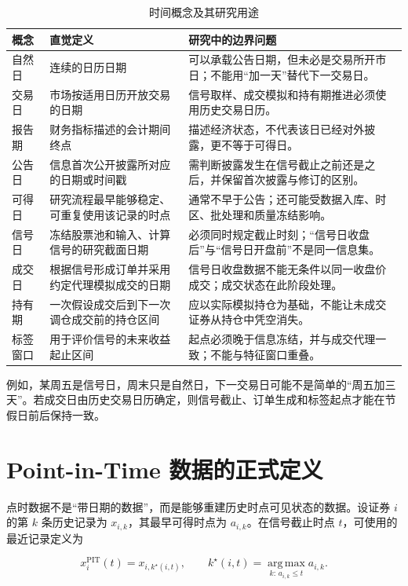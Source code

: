 \begingroup
\small
\setlength{\tabcolsep}{4pt}
\begin{longtable}{@{}p{}p{}p{}@{}}
\caption{时间概念及其研究用途}\label{tab:ch02-time-concepts}\\
\toprule
概念 & 直觉定义 & 研究中的边界问题 \\
\midrule
\endhead
自然日 & 连续的日历日期 & 可以承载公告日期，但未必是交易所开市日；不能用“加一天”替代下一交易日。 \\
交易日 & 市场按适用日历开放交易的日期 & 信号取样、成交模拟和持有期推进必须使用历史交易日历。 \\
报告期 & 财务指标描述的会计期间终点 & 描述经济状态，不代表该日已经对外披露，更不等于可得日。 \\
公告日 & 信息首次公开披露所对应的日期或时间戳 & 需判断披露发生在信号截止之前还是之后，并保留首次披露与修订的区别。 \\
可得日 & 研究流程最早能够稳定、可重复使用该记录的时点 & 通常不早于公告；还可能受数据入库、时区、批处理和质量冻结影响。 \\
信号日 & 冻结股票池和输入、计算信号的研究截面日期 & 必须同时规定截止时刻；“信号日收盘后”与“信号日开盘前”不是同一信息集。 \\
成交日 & 根据信号形成订单并采用约定代理模拟成交的日期 & 信号日收盘数据不能无条件以同一收盘价成交；成交状态在此阶段处理。 \\
持有期 & 一次假设成交后到下一次调仓成交前的持仓区间 & 应以实际模拟持仓为基础，不能让未成交证券从持仓中凭空消失。 \\
标签窗口 & 用于评价信号的未来收益起止区间 & 起点必须晚于信息冻结，并与成交代理一致；不能与特征窗口重叠。 \\
\bottomrule
\end{longtable}
\endgroup

例如，某周五是信号日，周末只是自然日，下一交易日可能不是简单的“周五加三天”。若成交日由历史交易日历确定，则信号截止、订单生成和标签起点才能在节假日前后保持一致。

\section{Point-in-Time 数据的正式定义}

点时数据不是“带日期的数据”，而是能够重建历史时点可见状态的数据。设证券 $i$ 的第 $k$ 条历史记录为 $x_{i,k}$，其最早可得时点为 $a_{i,k}$。在信号截止时点 $t$，可使用的最近记录定义为

\begin{equation}
  x_i^{\mathrm{PIT}}(t)=x_{i,k^\star(i,t)},\qquad
  k^\star(i,t)=\operatorname*{arg\,max}_{k:\,a_{i,k}\le t} a_{i,k}.
  \label{eq:ch02-pit-definition}
\end{equation}

